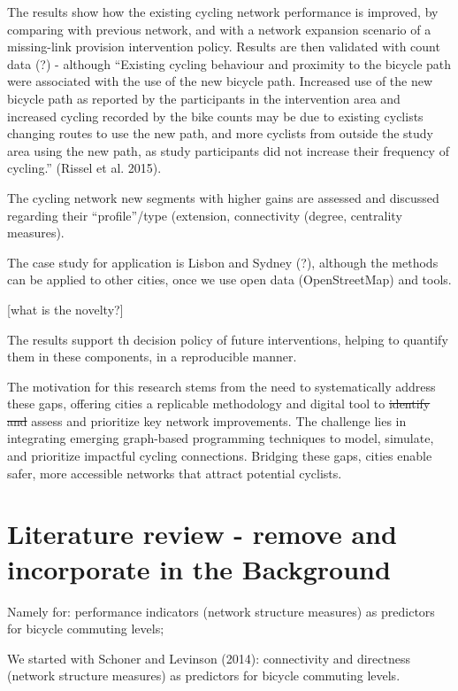 \documentclass[
  sn-nature,
]{sn-jnl}
\begin{document}
The results show how the existing cycling network performance is
improved, by comparing with previous network, and with a network
expansion scenario of a missing-link provision intervention policy.
Results are then validated with count data (?) - although ``Existing
cycling behaviour and proximity to the bicycle path were associated with
the use of the new bicycle path. Increased use of the new bicycle path
as reported by the participants in the intervention area and increased
cycling recorded by the bike counts may be due to existing cyclists
changing routes to use the new path, and more cyclists from outside the
study area using the new path, as study participants did not increase
their frequency of cycling.'' (Rissel et al. 2015).

The cycling network new segments with higher gains are assessed and
discussed regarding their ``profile''/type (extension, connectivity
(degree, centrality measures).

The case study for application is Lisbon and Sydney (?), although the
methods can be applied to other cities, once we use open data
(OpenStreetMap) and tools.

{[}what is the novelty?{]}

The results support th decision policy of future interventions, helping
to quantify them in these components, in a reproducible manner.

The motivation for this research stems from the need to systematically
address these gaps, offering cities a replicable methodology and digital
tool to \st{identify and} assess and prioritize key network
improvements. The challenge lies in integrating emerging graph-based
programming techniques to model, simulate, and prioritize impactful
cycling connections. Bridging these gaps, cities enable safer, more
accessible networks that attract potential cyclists.

\section{Literature review - remove and incorporate in the
Background}\label{literature-review---remove-and-incorporate-in-the-background}

Namely for: performance indicators (network structure measures) as
predictors for bicycle commuting levels;

We started with Schoner and Levinson (2014): connectivity and directness
(network structure measures) as predictors for bicycle commuting levels.
\end{document}
